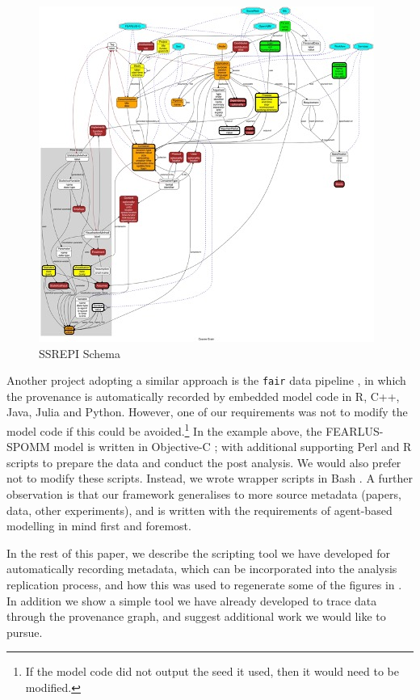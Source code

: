 \documentclass[runningheads]{llncs}
\begin{document}
\begin{figure} %
    \includegraphics[width=\textwidth]{img/schema.jpeg} %
\caption{SSREPI Schema} \label{fig:schema} \end{figure}

Another project adopting a similar approach is the \texttt{fair} data pipeline \cite{mitchell2022fair}, in which the provenance is automatically
recorded by embedded model code in R, C++, Java, Julia and Python. However, one of our requirements
was not to modify the model code if this could be avoided.\footnote{If the model code did not output the seed it used, then it would need to be modified.} In the example above, the FEARLUS-SPOMM model is written
in Objective-C \cite{objectivec}; with additional supporting Perl and R scripts to prepare the data and conduct the
post analysis. We would also prefer not to modify these scripts. Instead, we wrote wrapper scripts in Bash
\cite{bash4420}. A further observation is that our framework
generalises to more source metadata (papers, data, other experiments), and
is written with the requirements of agent-based modelling in mind first and foremost.

In the rest of this paper, we describe the scripting tool we have developed  for
automatically recording metadata, which can be incorporated into the analysis
replication process, and how this  was used to regenerate some of the figures
in \cite{polhill_nonlinearities_2013}. In addition we show a simple tool we have already developed to trace data through the provenance graph, and suggest additional work we would like to pursue.
\end{document}
